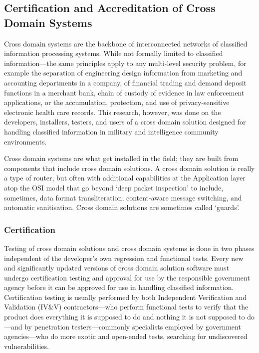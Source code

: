 \documentclass[10pt,letterpaper,conference]{IEEEtran}
\begin{document}
\subsection{Certification and Accreditation of Cross Domain Systems}

Cross domain systems are the backbone of interconnected networks of classified information
processing systems.  While not formally limited to classified information---the same principles
apply to any multi-level security problem, for example the separation of engineering design
information from marketing and accounting departments in a company, of financial trading and
demand deposit functions in a merchant bank, chain of custody of evidence in law enforcement
applications, or the accumulation, protection, and use of privacy-sensitive
electronic health care records.  This research, however, was done on the developers, installers,
testers, and users of a cross domain solution designed for handling classified information in
military and intelligence community environments.

Cross domain systems are what get installed in the field; they are built from components that
include cross domain solutions.  A cross domain solution is really a type of router, but often
with additional capabilities at the Application layer atop the OSI model that go beyond `deep
packet inspection' to include, sometimes, data format transliteration, content-aware message
switching, and automatic sanitisation.  Cross domain solutions are sometimes called `guards'.

\subsubsection{Certification}

Testing of cross domain solutions and cross domain systems is done in two phases independent of
the developer's own regression and functional tests.  Every new and significantly updated versions
of cross domain solution software must undergo certification testing and approval for use
by the responsible government agency before it can be approved for use in handling classified
information.  Certification testing is usually performed by both Independent Verification and
Validation (IV\&V) contractors---who perform functional tests to verify that the product
does everything it is supposed to do and nothing it is not supposed to do---and by
penetration testers---commonly specialists employed by government agencies---who do more exotic
and open-ended tests, searching for undiscovered vulnerabilities.
\end{document}
